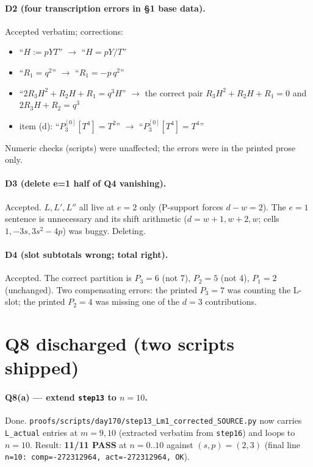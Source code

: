\documentclass[11pt]{article}
\newcommand{\code}[1]{\texttt{#1}}
\begin{document}
\paragraph{D2 (four transcription errors in \S 1 base data).} Accepted
verbatim; corrections:
\begin{itemize}[leftmargin=2em, itemsep=0pt]
  \item ``$H := pYT$'' $\to$ ``$H = pY/T$''
  \item ``$R_1 = q^2$'' $\to$ ``$R_1 = -p\, q^2$''
  \item ``$2R_3H^2 + R_2 H + R_1 = q^3H$'' $\to$ the correct pair
    $R_3 H^2 + R_2 H + R_1 = 0$ and $2 R_3 H + R_2 = q^3$
  \item item (d): ``$P_3^{[0]}[T^4] = T^2$'' $\to$ ``$P_3^{[0]}[T^4] = T^4$''
\end{itemize}
Numeric checks (scripts) were unaffected; the errors were in the printed
prose only.

\paragraph{D3 (delete e=1 half of Q4 vanishing).} Accepted. $L, L', L''$
all live at $e = 2$ only (P-support forces $d - w = 2$). The
$e=1$ sentence is unnecessary and its shift arithmetic ($d = w+1, w+2, w$;
cells $1, -3s, 3s^2 - 4p$) was buggy. Deleting.

\paragraph{D4 (slot subtotals wrong; total right).} Accepted. The
correct partition is $P_3 = 6$ (not 7), $P_2 = 5$ (not 4), $P_1 = 2$
(unchanged). Two compensating errors: the printed $P_3 = 7$ was counting
the L-slot; the printed $P_2 = 4$ was missing one of the $d=3$
contributions.

\section{Q8 discharged (two scripts shipped)}

\paragraph{Q8(a) — extend \code{step13} to $n=10$.} Done.
\code{proofs/scripts/day170/step13\_Lm1\_corrected\_SOURCE.py} now carries
\code{L\_actual} entries at $m = 9, 10$ (extracted verbatim from
\code{step16}) and loops to $n = 10$. Result: \textbf{11/11 PASS}
at $n = 0..10$ against $(s, p) = (2, 3)$ (final line
\code{n=10: comp=-272312964, act=-272312964, OK}).
\end{document}
